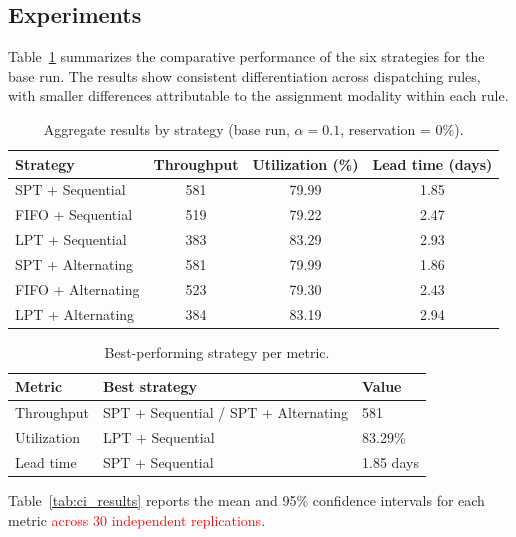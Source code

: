 \documentclass[sn-mathphys-num]{sn-jnl}
\begin{document}
\subsection{Experiments}\label{sec:exp}

Table~\ref{tab:main_results} summarizes the comparative performance of
the six strategies for the base run. The results show consistent
differentiation across dispatching rules, with smaller differences
attributable to the assignment modality within each rule.

\begin{table}[]
\centering
\caption{Aggregate results by strategy (base run, $\alpha = 0.1$,
reservation = 0\%).}
\label{tab:main_results}
\begin{tabular}{lccc}
\toprule
Strategy & Throughput & Utilization (\%) & Lead time (days) \\
\midrule
SPT + Sequential  & 581 & 79.99 & 1.85 \\
FIFO + Sequential & 519 & 79.22 & 2.47 \\
LPT + Sequential  & 383 & 83.29 & 2.93 \\
SPT + Alternating & 581 & 79.99 & 1.86 \\
FIFO + Alternating & 523 & 79.30 & 2.43 \\
LPT + Alternating & 384 & 83.19 & 2.94 \\
\bottomrule
\end{tabular}
\end{table}

\begin{table}[]
\centering
\caption{Best-performing strategy per metric.}
\label{tab:best_by_metric}
\begin{tabular}{lll}
\toprule
Metric & Best strategy & Value \\
\midrule
Throughput  & SPT + Sequential / SPT + Alternating & 581 \\
Utilization & LPT + Sequential & 83.29\% \\
Lead time   & SPT + Sequential & 1.85 days \\
\bottomrule
\end{tabular}
\end{table}

Table~\ref{tab:ci_results} reports the mean and 95\% confidence
intervals for each metric \textcolor{red}{across 30 independent replications}.
\end{document}
